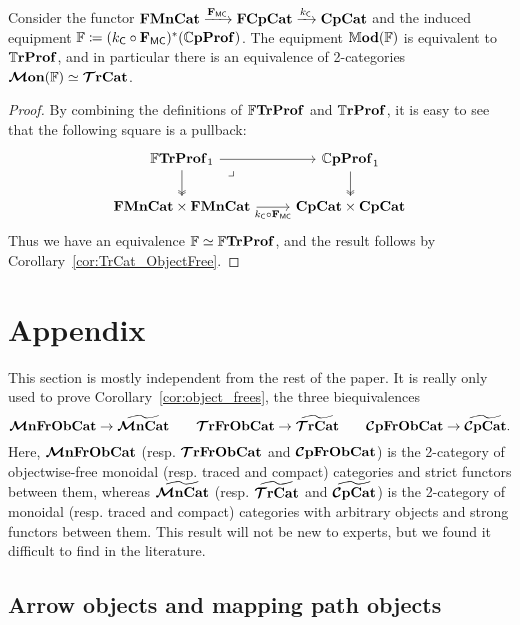 \documentclass[11pt,oneside,article]{memoir}
\begin{document}
\begin{proposition}
  Consider the functor $\mathbf{FMnCat}\xrightarrow{\mathbf{F}_{\mathsf{MC}}}\mathbf{FCpCat}\xrightarrow{k_{\mathsf{C}}}\mathbf{CpCat}$ and the induced equipment $\mathbb{F}\coloneqq(k_{\mathsf{C}}\circ\mathbf{F}_{\mathsf{MC}})^*(\mathbb{C}\mathbf{pProf})$. The equipment $\mathbb{M}\mathbf{od}(\mathbb{F})$ is equivalent to $\mathbb{T}\mathbf{rProf}$, and in particular there is an equivalence of 2-categories $\bm{\mathcal{M}}\mathbf{on}(\mathbb{F})\simeq\bm{\mathcal{T}}\mathbf{rCat}$. 

\end{proposition}   
\begin{proof}
   By combining the definitions of $\mathbb{F}\mathbf{TrProf}$ and $\mathbb{T}\mathbf{rProf}$, it is easy to see that the following square is a pullback:
   \begin{equation} \begin{tikzcd}
         \label{eqn:FTrProf_pullback}
      \dFrTrProf_1 \ar[r] \ar[d,two heads] \ar[dr,phantom,"\lrcorner" very near start]
         & \dCompProf_1 \ar[d,two heads] \\
      \FrMonCat\times\FrMonCat \ar[r,"k_{\MTCfont{C}}\circ\FMC"']
         & \CompCat\times\CompCat
   \end{tikzcd} \end{equation}
Thus we have an equivalence $\mathbb{F}\simeq\mathbb{F}\mathbf{TrProf}$, and the result follows by Corollary~\ref{cor:TrCat_ObjectFree}.
\end{proof}

\appendix
\chapter{Appendix}
      \label{appendix}
\linespread{1.2}\selectfont

This section is mostly independent from the rest of the paper. It is really only used to prove
Corollary~\ref{cor:object_frees}, the three biequivalences
\[
   \bm{\mathcal{M}}\mathbf{nFrObCat} \to \widetilde{\bm{\mathcal{M}}\mathbf{nCat}} \qquad
   \bm{\mathcal{T}}\mathbf{rFrObCat} \to \widetilde{\bm{\mathcal{T}}\mathbf{rCat}} \qquad
   \bm{\mathcal{C}}\mathbf{pFrObCat} \to \widetilde{\bm{\mathcal{C}}\mathbf{pCat}}.
\]
Here, $\bm{\mathcal{M}}\mathbf{nFrObCat}$ (resp. $\bm{\mathcal{T}}\mathbf{rFrObCat}$ and $\bm{\mathcal{C}}\mathbf{pFrObCat}$) is the 2-category of objectwise-free monoidal (resp. traced and compact) categories and strict functors between them, whereas $\widetilde{\bm{\mathcal{M}}\mathbf{nCat}}$ (resp. $\widetilde{\bm{\mathcal{T}}\mathbf{rCat}}$ and $\widetilde{\bm{\mathcal{C}}\mathbf{pCat}}$) is the 2-category of monoidal (resp. traced and compact) categories with arbitrary objects and strong functors between them. This result will not be new to experts, but we found it difficult to find in the literature.

\section{Arrow objects and mapping path objects}
\end{document}

